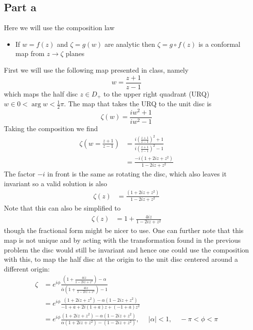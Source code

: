 \documentclass[a4paper,12pt]{article}
\begin{document}
\subsection*{Part a}
Here we will use the composition law
\begin{itemize}
	\item If $w=f(z)$ and $\zeta=g(w)$ are analytic then $\zeta= g\circ f(z)$ is a conformal map from $z\to \zeta$ planes
\end{itemize}
First we will use the following map presented in class, namely
\begin{equation}
w=\frac{z+1}{z-1}
\end{equation}
which maps the half disc $z\in D_+$ to the upper right quadrant (URQ) $w\in 0<\arg w <\frac{1}{2}\pi$. The map that takes the URQ to the unit disc is 
\begin{equation}
 \zeta(w)=\frac{iw^2+1}{iw^2-1}
\end{equation}
Taking the composition we find
\begin{equation}
\begin{aligned}
\zeta(w=\frac{z+1}{z-1})&=\frac{i\left(\frac{z+1}{z-1}\right)^2+1}{i\left(\frac{z+1}{z-1}\right)^2-1}\\
&=\frac{-i\left(1+2iz+z^2\right)}{1-2iz+z^2}
\end{aligned}
\end{equation}
The factor $-i$ in front is the same as rotating the disc, which also leaves it invariant so a valid solution is also
\begin{equation}
	\begin{aligned}
		\zeta(z)
		&=\frac{\left(1+2iz+z^2\right)}{1-2iz+z^2}
	\end{aligned}
\end{equation}
Note that this can also be simplified to
\begin{equation}
	\begin{aligned}
		\zeta(z)
		&=1+\frac{4iz}{1-2iz+z^2}
	\end{aligned}
\end{equation}
though the fractional form might be nicer to use. One can further note that this map is not unique and by acting with the transformation found in the previous problem the disc would still be invariant and hence one could use the composition with this, to map the half disc at the origin to the unit disc centered around a different origin:
\begin{equation}
	\begin{aligned}
		\zeta 
		&=e^{i\phi}\frac{\left(1+\frac{4iz}{1-2iz+z^2}\right)-\alpha}{\bar \alpha \left(1+\frac{4iz}{1-2iz+z^2}\right)-1}\\
		&=e^{i\phi}\frac{\left(1+2iz+z^2\right)-\alpha(1-2iz+z^2)}{-1+\bar a+2i(1+\bar a)z+(-1+\bar a)z^2}
		\\
		&=e^{i\phi}\frac{\left(1+2iz+z^2\right)-\alpha(1-2iz+z^2)}{\alpha(1+2iz+z^2)-\left(1-2iz+z^2\right)},~~~~~~|\alpha|<1,~~~~~-\pi<\phi < \pi
	\end{aligned}
\end{equation}
\end{document}
